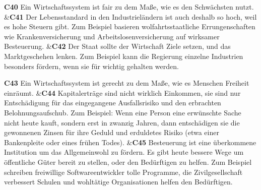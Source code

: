 \documentclass[
		11pt,
		a4paper,
		openright,
		oneside,
		ngerman
	]
	{book}
\begin{document}
\begin{longtabu}[htpb]
\textbf{C40}
		Ein Wirtschaftssystem ist fair zu dem Maße, wie es den Schwächsten nutzt.
&\textbf{C41} %
		Der Lebensstandard in den Industrieländern ist auch deshalb so hoch, weil es hohe Steuern gibt.
		Zum Beispiel basieren wolfahrtsstaatliche Errungenschaften wie Krankenversicherung und Arbeitslosenversicherung auf wirksamer Besteuerung.
&\textbf{C42}
		Der Staat sollte der Wirtschaft Ziele setzen, und das Marktgeschehen lenken.
		Zum Beispiel kann die Regierung einzelne Industrien besonders fördern, wenn sie für wichtig gehalten werden.
\\

\midrule

\textbf{C43}
		Ein Wirtschaftssystem ist gerecht zu dem Maße, wie es Menschen Freiheit einräumt.
&\textbf{C44} %
		Kapitalerträge sind nicht wirklich Einkommen, sie sind nur Entschädigung für das eingegangene Ausfallsrisiko und den erbrachten Belohnungsaufschub.
		Zum Beispiel: Wenn eine Person eine erwünschte Sache nicht heute kauft, sondern erst in zwanzig Jahren, dann entschädigen sie die gewonnenen Zinsen für ihre Geduld und erduldetes Risiko (etwa einer Bankenpleite oder eines frühen Todes).
&\textbf{C45} %
		Besteuerung ist eine überkommene Institution um das Allgemeinwohl zu fördern.
		Es gibt heute bessere Wege um öffentliche Güter bereit zu stellen, oder den Bedürftigen zu helfen.
		Zum Beispiel schreiben freiwillige Softwareentwickler tolle Programme, die Zivilgesellschaft verbessert Schulen und wohltätige Organisationen helfen den Bedürftigen.
\\


\end{longtabu}
\end{document}
